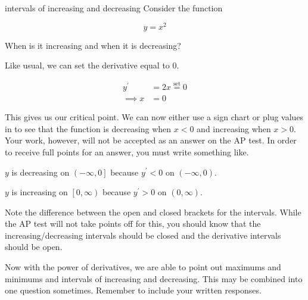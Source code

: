 \begin{example}{intervals of increasing and decreasing}
    Consider the function
    
    \[ y = x^2 \]
    
    When is it increasing and when it is decreasing?
    
    \vspace{0.3cm}
    
    Like usual, we can set the derivative equal to \( 0 \).
    
    \begin{align}
        y^\prime &= 2x \stackrel{\text{set}}{=} 0 \\
        \implies x &= 0
    \end{align}
    
    This gives us our critical point. We can now either use a sign chart or plug values in to see that the function is decreasing when \( x < 0 \) and increasing when \( x > 0 \). Your work, however, will not be accepted as an answer on the AP test. In order to receive full points for an answer, you must write something like.
    
    \begin{center}
    \( y \) is decreasing on \( \left( -\infty, 0 \right] \) because \( y^\prime < 0 \) on \( \left( -\infty, 0 \right) \).
    
    \( y \) is increasing on \( \left[ 0, \infty \right) \) because \( y^\prime > 0 \) on \( \left( 0, \infty \right) \).
    \end{center}
    
    Note the difference between the open and closed brackets for the intervals. While the AP test will not take points off for this, you should know that the increasing/decreasing intervals should be closed and the derivative intervals should be open.
\end{example}

Now with the power of derivatives, we are able to point out maximums and minimums and intervals of increasing and decreasing. This may be combined into one question sometimes. Remember to include your written responses.

